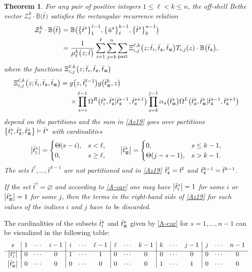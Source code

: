 \documentclass[10pt,a4paper]{amsart}
\newcommand{\so}{\scriptscriptstyle \rm I}
\newcommand{\st}{\scriptscriptstyle \rm I\hspace{-1pt}I}
\newcommand{\sth}{\scriptscriptstyle \rm I\hspace{-1pt}I\hspace{-1pt}I}
\newcommand{\bu}{\bar u}
\newcommand{\bt}{{\bar t}}
\newtheorem{thm}{Theorem}[section]
\theoremstyle{definition}
\def\BB{{\mathbb{B}}}
\def\r#1{\eqref{#1}}
\def\Z{\mathcal{Z}}
\def\Oml{\Omega^L}
\def\Omr{\Omega^R}
\begin{document}
\begin{thm}\label{rec-pr}
For any pair of positive integers $1\leq \ell< k\leq n$, the off-shell
Bethe vector
$\Z_\ell^{k}\cdot \BB\bigl(\bt\bigr)$ satisfies the
{\it rectangular} recurrence relation
\begin{align}
\Z_\ell^{k}\cdot \BB\bigl(\bt\bigr)&=
\BB\bigl(\bigl\{\bt^s\bigr\}_1^{\ell-1},\bigl\{\bu^{s}\bigr\}_\ell^{k-1},\bigl\{\bt^s\bigr\}_k^{n-1}\bigr)\nonumber\\
&=\frac{1}{\mu^k_\ell\bigl(z;\bt\bigr)}
\sum_{i=1}^\ell\sum_{j=k}^n \sum_{\rm part}
 \Xi^{\ell,k}_{i,j}\bigl(z;\bt_{\so},\bt_{\st},\bt_{\sth}\bigr)
T_{i,j}(z)\cdot\BB\bigl(\bt_{\st}\bigr) ,\label{Az19}
\end{align}
where the functions $\Xi^{\ell,k}_{i,j}\bigl(z;\bt_{\so},\bt_{\st},\bt_{\sth}\bigr)$
\begin{align}
\Xi^{\ell,k}_{i,j}\bigl(z;\bt_{\so},\bt_{\st},\bt_{\sth}\bigr)={}&
g\bigl(z, \bt^{\ell-1}_{\so}\bigr) g\bigl(\bt^k_{\sth}, z\bigr)\nonumber\\
&\times
\prod_{s=i}^{\ell-1}\Omr\bigl(\bt^s_{\so},\bt^s_{\st}|\bt^{s-1}_{\st},\bt^{s+1}_{\st}\bigr)
\prod_{s=k}^{j-1}\alpha_s\bigl(\bt^s_{\sth}\bigr)
\Oml\bigl(\bt^s_{\st},\bt^s_{\sth}|\bt^{s-1}_{\st},\bt^{s+1}_{\st}\bigr)\label{A-X-f}
\end{align}
depend on the partitions and
the sum in \r{Az19} goes over partitions
$ \bigl\{\bt^s_{\so},\bt^s_{\st},
\bt^s_{\sth}\bigr\}\vdash \bt^s$
with cardinalities
\begin{equation}\label{A-car}
\big|\bt^s_{\so}\big|=\begin{cases}\Theta(s-i),&s<\ell,\\0,&s\geq \ell,\end{cases}
\qquad
\big|\bt^s_{\sth}\big|=\begin{cases}0,&s\leq k-1,\\
\Theta(j-s-1), &s>k-1.\end{cases}
\end{equation}
 The sets $\bt^\ell,\dots,\bt^{k-1}$ are not partitioned
and in \r{Az19} $\bt^\ell_{\st}=\bt^\ell$ and $\bt^{k-1}_{\st}=\bt^{k-1}$.

If the set $\bt^s = \varnothing$ and according to
\r{A-car} one may have $\big|\bt^s_{\so}\big| = 1$ for some $i$ or
$\big|\bt^s_{\sth}\big| = 1$ for some $j$,
then the terms in the right-hand side
of \r{Az19} for such values of the indices $i$ and $j$ have to be discarded.
\end{thm}

The cardinalities of the subsets $\bt^s_{\so}$ and $\bt^s_{\sth}$ given by
\r{A-car} for $s=1,\dots,n-1$ can be visualized in the following table:
\begin{equation*}
\begin{array}{c|ccc|ccc|ccc|ccc|ccc}
s&1&\cdots&i-1&i&\cdots&\ell-1&\ell&\cdots&k-1&k&\cdots&j-1&j&\cdots&n-1\\[1mm]
\hline\\[-4.6mm]
\big|\bt^s_{\so}\big|&0&\cdots&0&1&\cdots&1&0&\cdots&0&0&\cdots&0&0&\cdots&0\\[1mm]
\big|\bt^s_{\sth}\big|&0&\cdots&0&0&\cdots&0&0&\cdots&0&1&\cdots&1&0&\cdots&0
\end{array}
\end{equation*}
\end{document}
